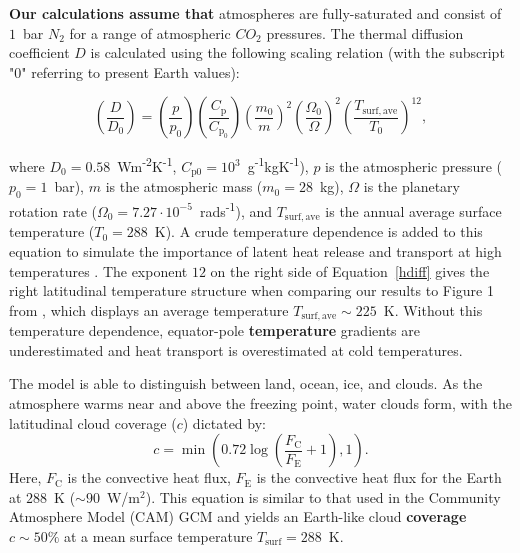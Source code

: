 \documentclass[fleqn,usenatbib]{mnras}
\providecommand{\DIFadd}[1]{{\bf #1}} %
\providecommand{\DIFdel}[1]{} %
\providecommand{\DIFaddbegin}{} %
\providecommand{\DIFaddend}{} %
\providecommand{\DIFdelbegin}{} %
\providecommand{\DIFdelend}{} %
\newcommand{\DIFscaledelfig}{0.5}
\newlength{\DIFdelgraphicswidth} %
\newlength{\DIFdelgraphicsheight} %
\newcommand{\DIFaddincludegraphics}[2][]{{\color{blue}\fbox{\DIFOincludegraphics[#1]{#2}}}} %
\newcommand{\DIFdelincludegraphics}[2][]{%
\sbox{\DIFdelgraphicsbox}{\DIFOincludegraphics[#1]{#2}}%
\settoboxwidth{\DIFdelgraphicswidth}{\DIFdelgraphicsbox} %
\settoboxtotalheight{\DIFdelgraphicsheight}{\DIFdelgraphicsbox} %
\scalebox{\DIFscaledelfig}{%
\parbox[b]{\DIFdelgraphicswidth}{\usebox{\DIFdelgraphicsbox}\\[-\baselineskip] \rule{\DIFdelgraphicswidth}{0em}}\llap{\resizebox{\DIFdelgraphicswidth}{\DIFdelgraphicsheight}{%
\setlength{\unitlength}{\DIFdelgraphicswidth}%
\begin{picture}(1,1)%
\thicklines\linethickness{2pt} %
{\color[rgb]{1,0,0}\put(0,0){\framebox(1,1){}}}%
{\color[rgb]{1,0,0}\put(0,0){\line( 1,1){1}}}%
{\color[rgb]{1,0,0}\put(0,1){\line(1,-1){1}}}%
\end{picture}%
}\hspace*{3pt}}} %
} %
\DeclareRobustCommand{\DIFaddbegin}{\DIFOaddbegin \let\includegraphics\DIFaddincludegraphics} %
\DeclareRobustCommand{\DIFaddend}{\DIFOaddend \let\includegraphics\DIFOincludegraphics} %
\DeclareRobustCommand{\DIFdelbegin}{\DIFOdelbegin \let\includegraphics\DIFdelincludegraphics} %
\DeclareRobustCommand{\DIFdelend}{\DIFOaddend \let\includegraphics\DIFOincludegraphics} %
\begin{document}
\DIFadd{Our calculations assume that }\DIFaddend atmospheres are fully-saturated and consist of $1$~bar $N_{\mathrm{2}}$ for a range of atmospheric $CO_{\mathrm{2}}$ pressures. The thermal diffusion coefficient $D$ is calculated using the following scaling relation (with the subscript "$0$" referring to present Earth values):

\begin{equation}
\label{hdiff}
    \left(\frac{D}{D_{\mathrm{0}}}\right)=\left(\frac{p}{p_{\mathrm{0}}}\right)\left(\frac{C_{\mathrm{p}}}{C_{\mathrm{p}_{0}}}\right)\left(\frac{m_{\mathrm{0}}}{m}\right)^{2}\left(\frac{\Omega_{0}}{\Omega}\right)^{2}\left(\frac{T_{\mathrm{surf,ave}}}{T_{\mathrm{0}}}\right)^{12},
\end{equation}

where $D_{\mathrm{0}}=0.58$~Wm\textsuperscript{-2}K\textsuperscript{-1}, $C_{\mathrm{p0}}=10^{3}$~g\textsuperscript{-1}kgK\textsuperscript{-1}), $p$ is the atmospheric pressure ($p_{\mathrm{0}}=1$~bar), $m$ is the atmospheric mass ($m_{\mathrm{0}}=28$~kg), $\Omega$ is the planetary rotation rate ($\Omega_{\mathrm{0}}=7.27 \cdot 10^{\mathrm{-5}}$~rads\textsuperscript{-1}), and $T_{\mathrm{surf,ave}}$ is the annual average surface temperature ($T_{\mathrm{0}}=288$~K). A crude temperature dependence is added to this equation to simulate the importance of latent heat release and transport at high temperatures \citep{Caballero2005a,Rose2017}. The exponent $12$ on the right side of Equation~\ref{hdiff} gives the right latitudinal temperature structure when comparing our results to Figure 1 from \citet{Turbet2017}, which displays an average temperature $T_{\mathrm{surf,ave}} \sim 225$~K. Without this temperature dependence, equator-pole \DIFdelbegin \DIFdel{temperatures }\DIFdelend \DIFaddbegin \DIFadd{temperature }\DIFaddend gradients are underestimated and heat transport is overestimated at cold temperatures.

The model is able to distinguish between land, ocean, ice, and clouds. As the atmosphere warms near and above the freezing point, water clouds form, with the latitudinal cloud coverage ($c$) dictated by:
\begin{equation}
\label{cloud_coverage}
    c = \min \left ( 0.72 \log \left( \frac{F_{\mathrm{C}}}{F_{\mathrm{E}}} + 1 \right ),1 \right ).
\end{equation}
Here, $F_\mathrm{C}$ is the convective heat flux, $F_\mathrm{E}$ is the convective heat flux for the Earth at $288$~K ($\sim 90$~W/m$^2$). This equation is similar to that used in the Community Atmosphere Model (CAM) GCM \citep{xu1991, yang2014} and yields an Earth-like cloud \DIFdelbegin \DIFdel{cover ($c$) of $\sim 50 \%$ }\DIFdelend \DIFaddbegin \DIFadd{coverage $c\sim 50 \%$ }\DIFaddend at a mean surface temperature $T_{\mathrm{surf}}=288$~K. 
\end{document}
